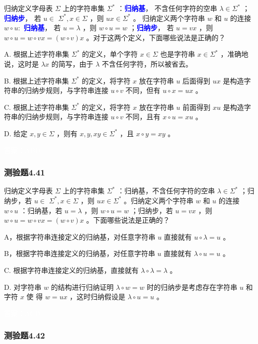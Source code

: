 \documentclass[UTF8, heading=true]{ctexart}
\begin{document}
归纳定义字母表 $\Sigma $ 上的字符串集 $\Sigma^*$ ：\textcolor{blue}{\textbf{归纳基}}，
不含任何字符的空串 $\lambda \in \Sigma^*$ ；\textcolor{blue}{\textbf{归纳步}}，
若 $u \in$ $\Sigma^*, x \in \Sigma$ ，则 $u x \in \Sigma^*$ 。
归纳定义两个字符串 $w$ 和 $u$ 的连接 $w \circ u:$ \textcolor{blue}{\textbf{归纳基}}，
若 $u=\lambda$ ，则 $w \circ u=w$ ；\textcolor{blue}{\textbf{归纳步}}，
若 $u=v x$ ，则 $w \circ u=w \circ v x=(w \circ v) x$ 。对于这两个定义，下面哪些说法是正确的？

A. 根据上述字符串集 $\Sigma^*$ 的定义，单个字符 $x \in \Sigma$ 也是字符串 $x \in \Sigma^*$ ，准确地说，这时是 $\lambda x$ 的简写，由于 $\lambda$ 不含任何字符，所以被省去。

B. 根据上述字符串集 $\Sigma^*$ 的定义，将字符 $x$ 放在字符串 $u$ 后面得到 $u x$ 是构造字符串的归纳步规则，与字符串连接 $u \circ v$ 不同，但有 $u \circ x=u x$ 。

C. 根据上述字符串集 $\Sigma^*$ 的定义，将字符 $x$ 放在字符串 $u$ 前面得到 $x u$ 是构造字符串的归纳步规则，与字符串连接 $u \circ v$ 不同，且有 $x \circ u=x u$ 。

D.  给定 $x, y \in \Sigma$ ，则有 $x, y, x y \in \Sigma^*$ ，且 $x \circ y=x y$ 。

\textcolor{white}{答案：ABD}

\subsubsection{测验题4.41}

归纳定义字母表 $\Sigma$ 上的字符串集 $\Sigma^*$ ：归纳基，不含任何字符的空串 $\lambda \in \Sigma^*$ ；归纳步，若 $u \in$ $\Sigma^*, x \in \Sigma$ ，则 $u x \in \Sigma^*$ 。归纳定义两个字符串 $w$ 和 $u$ 的连接 $w \circ u$ ：归纳基，若 $u=\lambda$ ，则 $w \circ u=w$ ；归纳步，若 $u=v x$ ，则 $w \circ u=w \circ v x=(w \circ v) x$ 。下面哪些说法是正确的？

A，根据字符串连接定义的归纳基，对任意字符串 $u$ 直接就有 $u \circ \lambda=u$ 。

B，根据字符串连接定义的归纳基，对任意字符串 $u$ 直接就有 $\lambda \circ u=u$ 。

C. 根据字符串连接定义的归纳基，直接就有 $\lambda \circ \lambda=\lambda$ 。

D. 对字符串 $w$ 的结构进行归纳证明 $\lambda \circ w=w$ 时的归纳步是考虑存在字符串 $u$ 和字符 $x$ 使
得 $w=u x$ ，这时归纳假设是 $\lambda \circ u=u$ 。


\textcolor{white}{答案：ACD}

\subsubsection{测验题4.42}
\end{document}
